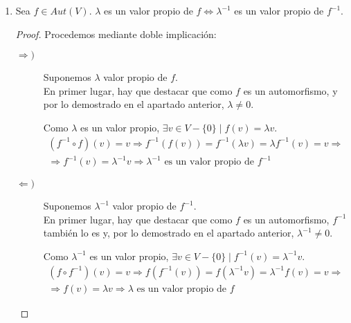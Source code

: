 \begin{ejercicio}
\begin{enumerate}
\begin{proof}
\begin{description}
                Además, como $\dim Im(f) = \dim V - \dim Ker(f) = \dim V$, también es un epimorfismo.

                Por tanto, $f$ es un isomorfismo, por lo que es un automorfismo.
            \end{description}
        \end{proof}

        \item Sea $f \in Aut(V)$. $\lambda$ es un valor propio de $f \Longleftrightarrow \lambda^{-1}$ es un valor propio de $f^{-1}$.
         \begin{proof} Procedemos mediante doble implicación:
            \begin{description}
                \item [$\Longrightarrow )$] Suponemos $\lambda$ valor propio de $f$.\\
                En primer lugar, hay que destacar que como $f$ es un automorfismo, y por lo demostrado en el apartado anterior, $\lambda\neq 0$.

                Como $\lambda$ es un valor propio, $\exists v \in V-\{0\} \mid f(v) = \lambda v$.
                \begin{multline*}
                    (f^{-1}\circ f)(v) = v \Longrightarrow f^{-1}(f(v)) = f^{-1}(\lambda v) = \lambda f^{-1}(v) =v
                    \Longrightarrow \\ \Longrightarrow
                    f^{-1}(v) = \lambda ^{-1} v \Longrightarrow \lambda^{-1} \text{ es un valor propio de } f^{-1}
                \end{multline*}

                \item [$\Longleftarrow )$] Suponemos $\lambda^{-1}$ valor propio de $f^{-1}$.\\
                En primer lugar, hay que destacar que como $f$ es un automorfismo, $f^{-1}$ también lo es y, por lo demostrado en el apartado anterior, $\lambda^{-1} \neq 0$.

                Como $\lambda^{-1}$ es un valor propio, $\exists v \in V-\{0\} \mid f^{-1}(v) = \lambda^{-1} v$.
                \begin{multline*}
                    (f\circ f^{-1})(v) = v \Longrightarrow f(f^{-1}(v)) = f(\lambda^{-1} v) = \lambda^{-1} f(v) =v
                    \Longrightarrow \\ \Longrightarrow
                    f(v) = \lambda v \Longrightarrow \lambda \text{ es un valor propio de } f
                \end{multline*}
            \end{description}
            
        \end{proof}
        
    \end{enumerate}
    
\end{ejercicio}

